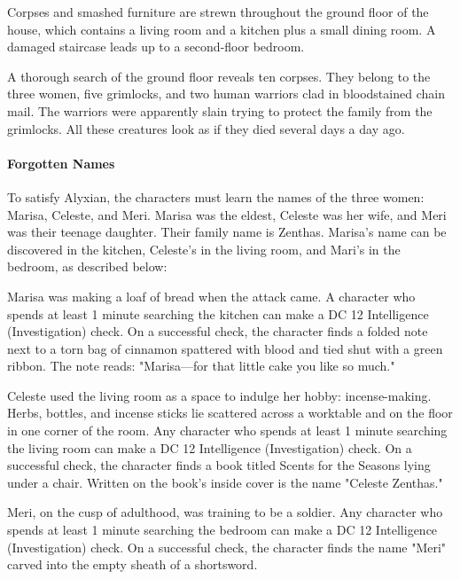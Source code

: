 \documentclass[10pt,a4paper,twoside,bg=print,twocolumn,openany,nodeprecatedcode]{dndbook}
\begin{document}
\begin{DndReadAloud}{}
Corpses and smashed furniture are strewn throughout the ground floor of the house, which contains a living room and a kitchen plus a small dining room. A damaged staircase leads up to a second-floor bedroom.

\end{DndReadAloud}

A thorough search of the ground floor reveals ten corpses. They belong to the three women, five grimlocks, and two human warriors clad in bloodstained chain mail. The warriors were apparently slain trying to protect the family from the grimlocks. All these creatures look as if they died several days a day ago.

\paragraph{Forgotten Names}
To satisfy Alyxian, the characters must learn the names of the three women: Marisa, Celeste, and Meri. Marisa was the eldest, Celeste was her wife, and Meri was their teenage daughter. Their family name is Zenthas. Marisa's name can be discovered in the kitchen, Celeste's in the living room, and Mari's in the bedroom, as described below:


\begin{description}[nolistsep]
\item[Kitchen.]
Marisa was making a loaf of bread when the attack came. A character who spends at least 1 minute searching the kitchen can make a DC 12 Intelligence (Investigation) check. On a successful check, the character finds a folded note next to a torn bag of cinnamon spattered with blood and tied shut with a green ribbon. The note reads: "Marisa—for that little cake you like so much."

\item[Living Room.]
Celeste used the living room as a space to indulge her hobby: incense-making. Herbs, bottles, and incense sticks lie scattered across a worktable and on the floor in one corner of the room. Any character who spends at least 1 minute searching the living room can make a DC 12 Intelligence (Investigation) check. On a successful check, the character finds a book titled Scents for the Seasons lying under a chair. Written on the book's inside cover is the name "Celeste Zenthas."

\item[Bedroom.]
Meri, on the cusp of adulthood, was training to be a soldier. Any character who spends at least 1 minute searching the bedroom can make a DC 12 Intelligence (Investigation) check. On a successful check, the character finds the name "Meri" carved into the empty sheath of a shortsword.
\end{description}
\end{document}
